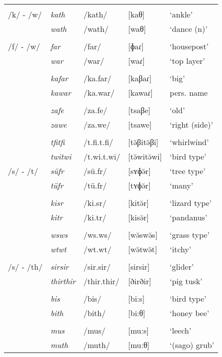 \begin{table}
\begin{tabularx}{\textwidth}{lllll}
		&&&&\\
		/k/ - /w/ & \emph{kath} & /kath/ & [kaθ]&`ankle'\\
		& \emph{wath} & /wath/ & [waθ]&`dance (n)'\\
		&&&&\\
		/f/ - /w/ & \emph{far} & /far/ & [ɸaɾ] & `housepost'\\
		& \emph{war} & /war/ & [waɾ] & `top layer'\\
		&&&&\\
		& \emph{kafar} & /ka.far/ & [kaβaɾ] & `big'\\
		& \emph{kawar} & /ka.war/ & [kawaɾ] & pers. name\\
		&&&&\\
		& \emph{zafe} & /za.fe/ & [tsaβe] & `old'\\
		& \emph{zawe} & /za.we/ & [tsawe] & `right (side)'\\
		&&&&\\
		& \emph{tfitfi} & /t.fi.t.fi/ & [tə̆βitə̆βi] & `whirlwind'\\
		& \emph{twitwi} & /t.wi.t.wi/ & [tə̆witə̆wi] & `bird type'\\
		/s/ - /t/ & \emph{süfr} & /sü.fr/ & [sʏɸə̆r] & `tree type'\\
		& \emph{tüfr} & /tü.fr/ & [tʏɸə̆r] & `many'\\
		&&&&\\
		& \emph{kisr} & /ki.sr/ & [kitə̆r] & `lizard type'\\
		& \emph{kitr} & /ki.tr/ & [kisə̆r] & `pandanus'\\
		&&&&\\
		& \emph{wsws} & /ws.ws/ & [wə̆swə̆s] & `grass type'\\
		& \emph{wtwt} & /wt.wt/ & [wə̆twə̆t] & `itchy'\\
		&&&&\\
		/s/ - /th/ & \emph{sirsir} & /sir.sir/ & [sirsir] & `glider'\\
		& \emph{thirthir} & /thir.thir/ & [ðirðir] & `pig tusk'\\
		&&&&\\
		& \emph{bis} & /bis/ & [\super{m}bi:s] & `bird type'\\
		& \emph{bith} & /bith/ & [\super{m}bi:θ] & `honey bee'\\
		&&&&\\
		& \emph{mus} & /mus/ & [mu:s] & `leech'\\
		& \emph{muth} & /muth/ & [mu:θ] & `(sago) grub'\\

\end{tabularx}
\end{table}
